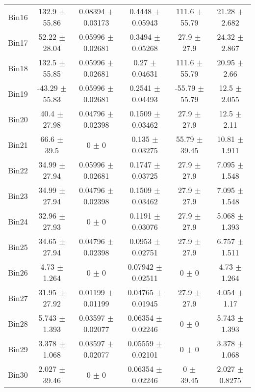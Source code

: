 \begin{tabular}{@{\extracolsep{4pt}}lccccc@{}}
     Bin16 & 132.9 $\pm$ 55.86 & 0.08394 $\pm$ 0.03173 & 0.4448 $\pm$ 0.05943 & 111.6 $\pm$ 55.79 & 21.28 $\pm$ 2.682 \\ 
     Bin17 & 52.22 $\pm$ 28.04 & 0.05996 $\pm$ 0.02681 & 0.3494 $\pm$ 0.05268 & 27.9 $\pm$ 27.9 & 24.32 $\pm$ 2.867 \\ 
     Bin18 & 132.5 $\pm$ 55.85 & 0.05996 $\pm$ 0.02681 & 0.27 $\pm$ 0.04631 & 111.6 $\pm$ 55.79 & 20.95 $\pm$ 2.66 \\ 
     Bin19 & -43.29 $\pm$ 55.83 & 0.05996 $\pm$ 0.02681 & 0.2541 $\pm$ 0.04493 & -55.79 $\pm$ 55.79 & 12.5 $\pm$ 2.055 \\ 
     Bin20 & 40.4 $\pm$ 27.98 & 0.04796 $\pm$ 0.02398 & 0.1509 $\pm$ 0.03462 & 27.9 $\pm$ 27.9 & 12.5 $\pm$ 2.11 \\ 
     Bin21 & 66.6 $\pm$ 39.5 & 0 $\pm$ 0 & 0.135 $\pm$ 0.03275 & 55.79 $\pm$ 39.45 & 10.81 $\pm$ 1.911 \\ 
     Bin22 & 34.99 $\pm$ 27.94 & 0.05996 $\pm$ 0.02681 & 0.1747 $\pm$ 0.03725 & 27.9 $\pm$ 27.9 & 7.095 $\pm$ 1.548 \\ 
     Bin23 & 34.99 $\pm$ 27.94 & 0.04796 $\pm$ 0.02398 & 0.1509 $\pm$ 0.03462 & 27.9 $\pm$ 27.9 & 7.095 $\pm$ 1.548 \\ 
     Bin24 & 32.96 $\pm$ 27.93 & 0 $\pm$ 0 & 0.1191 $\pm$ 0.03076 & 27.9 $\pm$ 27.9 & 5.068 $\pm$ 1.393 \\ 
     Bin25 & 34.65 $\pm$ 27.94 & 0.04796 $\pm$ 0.02398 & 0.0953 $\pm$ 0.02751 & 27.9 $\pm$ 27.9 & 6.757 $\pm$ 1.511 \\ 
     Bin26 & 4.73 $\pm$ 1.264 & 0 $\pm$ 0 & 0.07942 $\pm$ 0.02511 & 0 $\pm$ 0 & 4.73 $\pm$ 1.264 \\ 
     Bin27 & 31.95 $\pm$ 27.92 & 0.01199 $\pm$ 0.01199 & 0.04765 $\pm$ 0.01945 & 27.9 $\pm$ 27.9 & 4.054 $\pm$ 1.17 \\ 
     Bin28 & 5.743 $\pm$ 1.393 & 0.03597 $\pm$ 0.02077 & 0.06354 $\pm$ 0.02246 & 0 $\pm$ 0 & 5.743 $\pm$ 1.393 \\ 
     Bin29 & 3.378 $\pm$ 1.068 & 0.03597 $\pm$ 0.02077 & 0.05559 $\pm$ 0.02101 & 0 $\pm$ 0 & 3.378 $\pm$ 1.068 \\ 
     Bin30 & 2.027 $\pm$ 39.46 & 0 $\pm$ 0 & 0.06354 $\pm$ 0.02246 & 0 $\pm$ 39.45 & 2.027 $\pm$ 0.8275 \\ 
\hline\hline
  \end{tabular}
